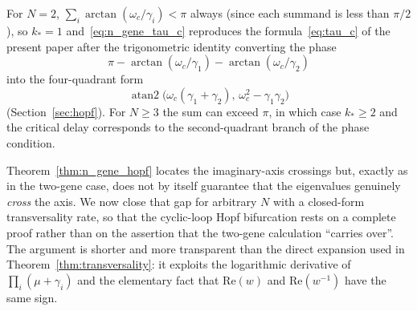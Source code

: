 \documentclass[sn-mathphys,Numbered]{sn-jnl}
\theoremstyle{thmstyleone}
\theoremstyle{thmstyletwo}
\theoremstyle{thmstylethree}
\begin{document}
For $N=2$, $\sum_i\arctan(\omega_c/\gamma_i)<\pi$ always (since each
summand is less than $\pi/2$), so $k_*=1$
and~\eqref{eq:n_gene_tau_c} reproduces the formula~\eqref{eq:tau_c}
of the present paper after the trigonometric identity converting the
phase
\[
\pi-\arctan(\omega_c/\gamma_1)-\arctan(\omega_c/\gamma_2)
\]
into the four-quadrant form
\[
\operatorname{atan2}\bigl(\omega_c(\gamma_1+\gamma_2),\,
\omega_c^2-\gamma_1\gamma_2\bigr)
\]
(Section~\ref{sec:hopf}). For $N\geq 3$ the sum can exceed $\pi$, in
which case $k_*\geq 2$ and the critical delay corresponds to the
second-quadrant branch of the phase condition.

Theorem~\ref{thm:n_gene_hopf} locates the imaginary-axis crossings but,
exactly as in the two-gene case, does not by itself guarantee that the
eigenvalues genuinely \emph{cross} the axis. We now close that gap for
arbitrary $N$ with a closed-form transversality rate, so that the
cyclic-loop Hopf bifurcation rests on a complete proof rather than on
the assertion that the two-gene calculation ``carries over''. The
argument is shorter and more transparent than the direct expansion used
in Theorem~\ref{thm:transversality}: it exploits the logarithmic
derivative of $\prod_i(\mu+\gamma_i)$ and the elementary fact that
$\mathrm{Re}(w)$ and $\mathrm{Re}(w^{-1})$ have the same sign.
\end{document}
